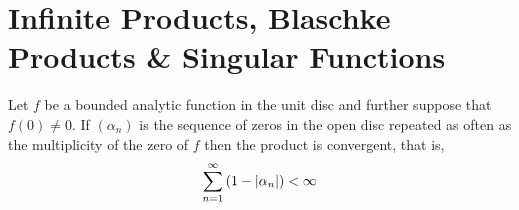 \section{Infinite Products, Blaschke Products \& Singular Functions}

\begin{theorem}
    Let $f$ be a bounded analytic function in the unit disc and further suppose that $f\left( 0 \right) \ne 0$. If $\left( \alpha_{n} \right)$ is the sequence of zeros in the open disc repeated as often as the multiplicity of the zero of $f$ then the product is convergent, that is, 
    \begin{equation*}
	\sum_{n=1}^{\infty} \left( 1-\left\lvert \alpha_{n} \right\rvert \right) < \infty
    \end{equation*}
    \label{thm:Blaschke-product}
\end{theorem}
